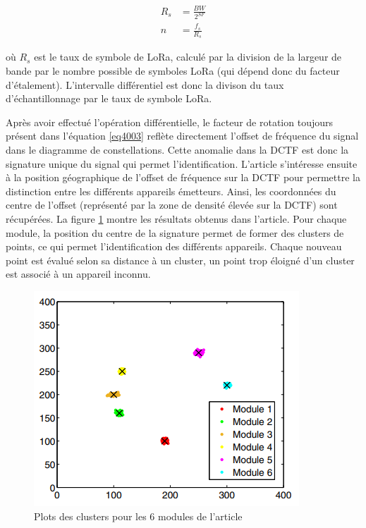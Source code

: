 \begin{align}\label{eq4006}
	R_s &= \frac{BW}{2^{SF}} \\
	n	&= \frac{f_s}{R_s}
\end{align}

où $R_s$ est le taux de symbole de \ac{LoRa}, calculé par la division de la largeur de bande par le nombre possible de symboles \ac{LoRa} (qui dépend donc du facteur d'étalement). L'intervalle différentiel est donc la divison du taux d'échantillonnage par le taux de symbole \ac{LoRa}.

\vspace{0.1cm}

Après avoir effectué l'opération différentielle, le facteur de rotation toujours présent dans l'équation \ref{eq4003} reflète directement l'offset de fréquence du signal dans le diagramme de constellations. Cette anomalie dans la \ac{DCTF} est donc la signature unique du signal qui permet l'identification. L'article s'intéresse ensuite à la position géographique de l'offset de fréquence sur la \ac{DCTF} pour permettre la distinction entre les différents appareils émetteurs. Ainsi, les coordonnées du centre de l'offset (représenté par la zone de densité élevée sur la \ac{DCTF}) sont récupérées. La figure \ref{term4000} montre les résultats obtenus dans l'article. Pour chaque module, la position du centre de la signature permet de former des clusters de points, ce qui permet l'identification des différents appareils. Chaque nouveau point est évalué selon sa distance à un cluster, un point trop éloigné d'un cluster est associé à un appareil inconnu.


\begin{figure}[h]
\centering

\includegraphics[scale=0.8]{images/impossible.png}
\caption{Plots des clusters pour les 6 modules de l'article\cite{loraDCTF}}\label{term4000}
\end{figure}

